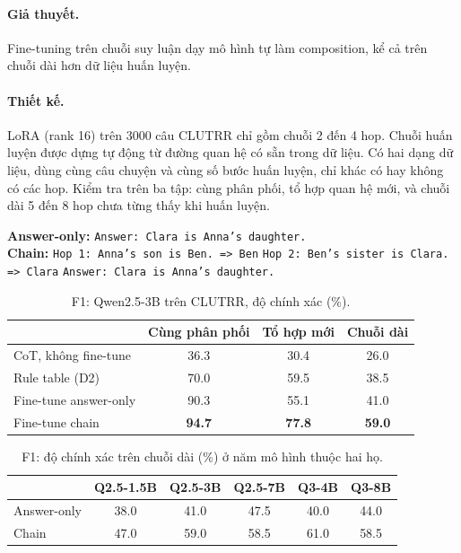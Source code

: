 \documentclass[11pt]{article}
\begin{document}
\paragraph{Giả thuyết.} Fine-tuning trên chuỗi suy luận dạy mô hình tự làm composition, kể cả trên chuỗi
dài hơn dữ liệu huấn luyện.

\paragraph{Thiết kế.} LoRA (rank 16) trên 3000 câu CLUTRR chỉ gồm chuỗi 2 đến 4 hop. Chuỗi huấn luyện được
dựng tự động từ đường quan hệ có sẵn trong dữ liệu. Có hai dạng dữ liệu, dùng cùng câu chuyện và cùng số
bước huấn luyện, chỉ khác có hay không có các hop. Kiểm tra trên ba tập: cùng phân phối, tổ hợp quan hệ
mới, và chuỗi dài 5 đến 8 hop chưa từng thấy khi huấn luyện.

\begin{vidu}
\textbf{Answer-only:} \texttt{Answer: Clara is Anna's daughter.}\\
\textbf{Chain:} \texttt{Hop 1: Anna's son is Ben. => Ben} \quad \texttt{Hop 2: Ben's sister is Clara. =>
Clara} \quad \texttt{Answer: Clara is Anna's daughter.}
\end{vidu}

\begin{table}[h]
\centering\small
\caption{F1: Qwen2.5-3B trên CLUTRR, độ chính xác (\%).}
\begin{tabular}{lccc}
\toprule
 & Cùng phân phối & Tổ hợp mới & Chuỗi dài \\
\midrule
CoT, không fine-tune & 36.3 & 30.4 & 26.0 \\
Rule table (D2) & 70.0 & 59.5 & 38.5 \\
Fine-tune answer-only & 90.3 & 55.1 & 41.0 \\
Fine-tune chain & \textbf{94.7} & \textbf{77.8} & \textbf{59.0} \\
\bottomrule
\end{tabular}
\end{table}

\begin{table}[h]
\centering\small
\caption{F1: độ chính xác trên chuỗi dài (\%) ở năm mô hình thuộc hai họ.}
\begin{tabular}{lccccc}
\toprule
 & Q2.5-1.5B & Q2.5-3B & Q2.5-7B & Q3-4B & Q3-8B \\
\midrule
Answer-only & 38.0 & 41.0 & 47.5 & 40.0 & 44.0 \\
Chain & 47.0 & 59.0 & 58.5 & 61.0 & 58.5 \\
\bottomrule
\end{tabular}
\end{table}
\end{document}
